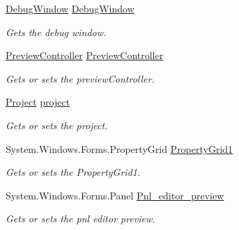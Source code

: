 \begin{DoxyCompactItemize}
\item 
\hyperlink{class_a_rdev_kit_1_1_view_1_1_debug_window}{Debug\-Window} \hyperlink{class_a_rdev_kit_1_1_editor_window_a680468ae45b84228fb668d8dbb0aba48}{Debug\-Window}
\begin{DoxyCompactList}\small\item\em Gets the debug window. \end{DoxyCompactList}\item 
\hyperlink{class_preview_controller}{Preview\-Controller} \hyperlink{class_a_rdev_kit_1_1_editor_window_ae57e383a1684241c86a5253d1fd8197a}{Preview\-Controller}
\begin{DoxyCompactList}\small\item\em Gets or sets the preview\-Controller. \end{DoxyCompactList}\item 
\hyperlink{class_a_rdev_kit_1_1_model_1_1_project_1_1_project}{Project} \hyperlink{class_a_rdev_kit_1_1_editor_window_aa7e64c912e3d904fae0ec52588be0baa}{project}
\begin{DoxyCompactList}\small\item\em Gets or sets the project. \end{DoxyCompactList}\item 
System.\-Windows.\-Forms.\-Property\-Grid \hyperlink{class_a_rdev_kit_1_1_editor_window_a8f5f7c03bcb123e147d07b5023a60292}{Property\-Grid1}
\begin{DoxyCompactList}\small\item\em Gets or sets the Property\-Grid1. \end{DoxyCompactList}\item 
System.\-Windows.\-Forms.\-Panel \hyperlink{class_a_rdev_kit_1_1_editor_window_a63d02d43b7dfe8841d6e1204948ecb17}{Pnl\-\_\-editor\-\_\-preview}
\begin{DoxyCompactList}\small\item\em Gets or sets the pnl editor preview. \end{DoxyCompactList}\item 

\end{DoxyCompactItemize}
